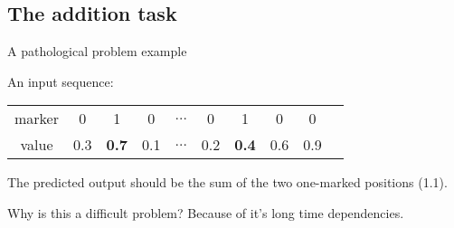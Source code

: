 \subsection{The addition task}
\begin{frame}{A pathological problem example}


An input sequence:

\vspace{1em}

\begin{tabular}{|c|c|c|c|c|c|c|c|c|c}
	\hline  marker & 0&  1&  0&  $\hdots$& 0 & 1 & 0 & 0  \\ 
	  value & 0.3&  \textbf{0.7}&  0.1&  $\hdots$& 0.2& \textbf{0.4} & 0.6& 0.9  \\ 
	\hline 
\end{tabular}

\vspace{1em}
The predicted output should be the sum of the two one-marked positions (1.1). 
\pause
\vspace{1em}
\begin{block}{Why is this a difficult problem?}
	Because of it's long time dependencies.
\end{block}

\end{frame}

